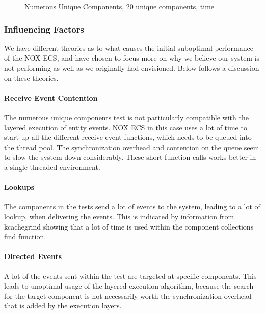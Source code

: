 \begin{figure}[H]
\centering
{}
\caption{Numerous Unique Components, 20 unique components, time}
\label{fig:benchmarking_numerous_unique_20_time}
\end{figure}

\subsubsection{Influencing Factors}
We have different theories as to what causes the initial suboptimal performance of the NOX ECS,
and have chosen to focus more on why we believe our system is not performing as well as we originally had envisioned.
Below follows a discussion on these theories.

\paragraph{Receive Event Contention}
The numerous unique components test is not particularly compatible with the layered execution of entity events.
NOX ECS in this case uses a lot of time to start up all the different receive event functions, which needs
to be queued into the thread pool.
The synchronization overhead and contention on the queue seem to slow the system down considerably.
These short function calls works better in a single threaded environment.

\paragraph{Lookups}
The components in the tests send a lot of events to the system, leading to a lot of lookup,
when delivering the events.
This is indicated by information from kcachegrind showing that a lot of time is used within the component collections find function.

\paragraph{Directed Events}
A lot of the events sent within the test are targeted at specific components.
This leads to unoptimal usage of the layered execution algorithm, because the search for the target component
is not necessarily worth the synchronization overhead that is added by the execution layers.

